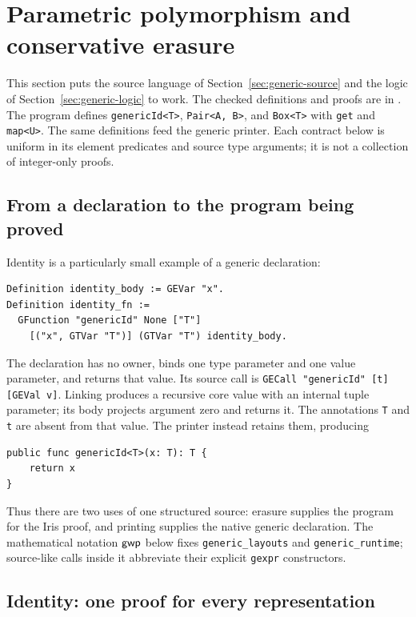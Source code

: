 \clearpage
\section{Parametric polymorphism and conservative erasure}
\label{sec:generics}

This section puts the source language of Section~\ref{sec:generic-source}
and the logic of Section~\ref{sec:generic-logic} to work. The checked
definitions and proofs are in
. The program defines
\texttt{genericId<T>}, \texttt{Pair<A, B>}, and \texttt{Box<T>} with
\texttt{get} and \texttt{map<U>}. The same definitions feed the generic
printer. Each contract below is uniform in its element predicates and
source type arguments; it is not a collection of integer-only proofs.

\subsection{From a declaration to the program being proved}

Identity is a particularly small example of a generic declaration:
\begin{lstlisting}
Definition identity_body := GEVar "x".
Definition identity_fn :=
  GFunction "genericId" None ["T"]
    [("x", GTVar "T")] (GTVar "T") identity_body.
\end{lstlisting}
The declaration has no owner, binds one type parameter and one value
parameter, and returns that value. Its source call is
\texttt{GECall "genericId" [t] [GEVal v]}. Linking produces a recursive
core value with an internal tuple parameter; its body projects argument
zero and returns it. The annotations \texttt{T} and \texttt{t} are absent
from that value. The printer instead retains them, producing
\begin{lstlisting}
public func genericId<T>(x: T): T {
    return x
}
\end{lstlisting}
Thus there are two uses of one structured source: erasure supplies the
program for the Iris proof, and printing supplies the native generic
declaration. The mathematical notation \(\mathsf{gwp}\) below fixes
\texttt{generic\_layouts} and \texttt{generic\_runtime}; source-like
calls inside it abbreviate their explicit \texttt{gexpr} constructors.

\subsection{Identity: one proof for every representation}

